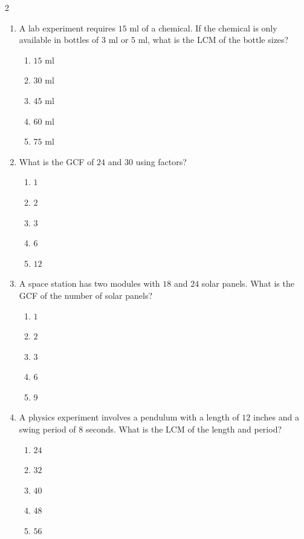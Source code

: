 \documentclass[10pt]{article}
\begin{document}
\begin{multicols}{2}
\begin{enumerate}[label=\textbf{Q\arabic*.}, leftmargin=*, itemsep=6pt, parsep=0pt]
  \item \small A lab experiment requires $15$ ml of a chemical. If the chemical is only available in bottles of $3$ ml or $5$ ml, what is the LCM of the bottle sizes?
  \begin{enumerate}[label=(\Alph*), leftmargin=0.6cm, nosep, itemsep=2pt]
    \item $15$ ml
    \item $30$ ml
    \item $45$ ml
    \item $60$ ml
    \item $75$ ml
  \end{enumerate}

  \item \small What is the GCF of $24$ and $30$ using factors?
  \begin{enumerate}[label=(\Alph*), leftmargin=0.6cm, nosep, itemsep=2pt]
    \item $1$
    \item $2$
    \item $3$
    \item $6$
    \item $12$
  \end{enumerate}

  \item \small A space station has two modules with $18$ and $24$ solar panels. What is the GCF of the number of solar panels?
  \begin{enumerate}[label=(\Alph*), leftmargin=0.6cm, nosep, itemsep=2pt]
    \item $1$
    \item $2$
    \item $3$
    \item $6$
    \item $9$
  \end{enumerate}

  \item \small A physics experiment involves a pendulum with a length of $12$ inches and a swing period of $8$ seconds. What is the LCM of the length and period?
  \begin{enumerate}[label=(\Alph*), leftmargin=0.6cm, nosep, itemsep=2pt]
    \item $24$
    \item $32$
    \item $40$
    \item $48$
    \item $56$
  \end{enumerate}


\end{enumerate}
\end{multicols}
\end{document}
